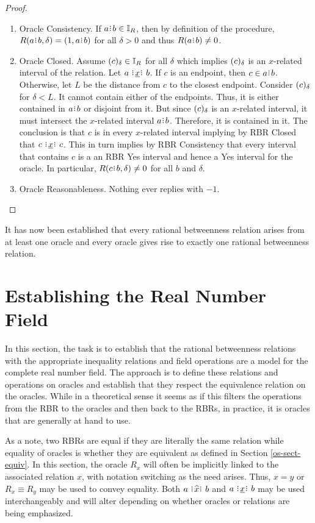 \documentclass[12pt]{article}
\begin{document}
\begin{proof}
\begin{enumerate}
        \item Oracle Consistency. If $a\rint b \in \mathbb{I}_R$, then by definition of the procedure, $R(a\rint b, \delta) = (1, a\rint b)$ for all $\delta >0$ and thus $R(a\rint b) \neq 0$.
        
        \item Oracle Closed. Assume $(c)_{\delta} \in \mathbb{I}_R$ for all $\delta$ which implies $(c)_{\delta}$ is an $x$-related interval of the relation. Let $a \xrel b$. If $c$ is an endpoint, then $c \in a\rint b$. Otherwise, let $L$ be the distance from $c$ to the closest endpoint. Consider $(c)_{\delta}$ for $\delta < L$. It cannot contain either of the endpoints. Thus, it is either contained in $a\rint b$ or disjoint from it. But since $(c)_{\delta}$ is an $x$-related interval, it must intersect the $x$-related interval $a\rint b$. Therefore, it is contained in it. The conclusion is that $c$ is in every $x$-related interval implying by RBR Closed that $c \xrel c$. This in turn implies by RBR Consistency that every interval that contains $c$ is a an RBR Yes interval and hence a Yes interval for the oracle. In particular, $R(c\rint b, \delta) \neq 0$ for all $b$ and $\delta$. 

        \item Oracle Reasonableness. Nothing ever replies with $-1$. 
        
    \end{enumerate}
\end{proof}


It has now been established that every rational betweenness relation arises from at least one oracle and every oracle gives rise to exactly one rational betweenness relation. 


\section{Establishing the Real Number Field}

In this section, the task is to establish that the rational betweenness relations with the appropriate inequality relations and field operations are a model for the complete real number field. The approach is to define these relations and operations on oracles and establish that they respect the equivalence relation on the oracles. While in a theoretical sense it seems as if this filters the operations from the RBR to the oracles and then back to the RBRs, in practice, it is oracles that are generally at hand to use. 

As a note, two RBRs are equal if they are literally the same relation while equality of oracles is whether they are equivalent as defined in Section \ref{os-sect-equiv}. In this section, the oracle $R_x$ will often be implicitly linked to the associated relation $x$, with notation switching as the need arises. Thus, $x = y$ or $R_x \equiv R_y$ may be used to convey equality. Both $a \xora b$ and $a \xrel b$ may be used interchangeably and will alter depending on whether oracles or relations are being emphasized. 
\end{document}
